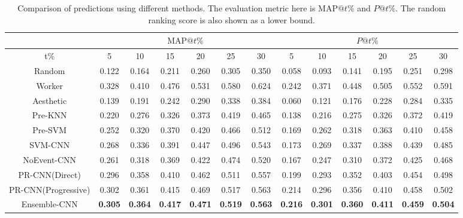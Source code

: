 \documentclass[10pt,twocolumn,letterpaper]{article}
\begin{document}
\begin{table*}[]
\begin{center}
\small
\begin{tabular}{c|cccccc|cccccc}
\hline
          & \multicolumn{6}{c|}{$\text{MAP}@t\%$}          & \multicolumn{6}{c}{$P@t\%$} \\ \hline  \hline
t\%       & 5     & 10    & 15    & 20    & 25    & 30    & 5  & 10  & 15 & 20 & 25 & 30 \\ \hline
Random & 0.122 & 0.164 & 0.211 & 0.260 & 0.305 & 0.350 & 0.058  &  0.093   &  0.141  &  0.195  & 0.251   & 0.298   \\
Worker & 0.328 & 0.410 & 0.476 & 0.531 & 0.580 & 0.624 & 0.242   &  0.371   &  0.448  &  0.505  & 0.552   & 0.591   \\ \hline
Aesthetic & 0.139 & 0.191 & 0.242 & 0.290 & 0.338 & 0.384 & 0.060   &  0.121    &   0.176 &    0.228&0.284    &    0.335\\ 
Pre-KNN & 0.220 & 0.276 & 0.326 & 0.373 & 0.419 & 0.465 &  0.138   &  0.216   & 0.275   & 0.326   &   0.372 & 0.419    \\
Pre-SVM &0.252&0.320&0.370&0.420&0.466&0.512&0.169&0.262&0.318&0.363&0.410&0.458 \\
SVM-CNN & 0.268 & 0.336 & 0.391 & 0.447 & 0.496 & 0.543 &  0.173  &  0.269   &  0.337  &   0.388 &   0.439 &    0.485\\ \hline
NoEvent-CNN & 0.261 & 0.318 & 0.369 & 0.422 & 0.474 & 0.520 &  0.167  &  0.247   &    0.310&    0.372&  0.425  & 0.468\\
PR-CNN(Direct)    & 0.296 & 0.358 & 0.410 & 0.462 & 0.511 &  0.557     &  0.199  &  0.293   &    0.352&    0.403&  0.454  &   0.498 \\ 
PR-CNN(Progressive)    &0.302&0.361&0.415&0.469&0.517&0.563&0.214&0.296&0.356&0.410&0.458&0.502 \\
Ensemble-CNN & \textbf{0.305}& \textbf{0.364}& \textbf{0.417}& \textbf{0.471}& \textbf{0.519}& \textbf{0.563}& \textbf{0.216}& 
\textbf{0.301}& \textbf{0.360}& \textbf{0.411}& \textbf{0.459}& \textbf{0.504} \\ \hline 


\end{tabular}
\end{center}
\caption{Comparison of predictions using different methods. The evaluation metric here is $\text{MAP}@t\%$ and $P@t\%$. The random ranking score is also shown as a lower bound.}

\label{aesthetic_table}
\end{table*}
\end{document}
